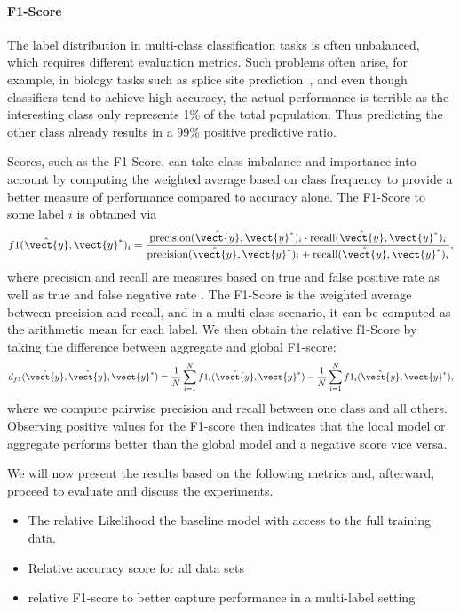 \paragraph*{F1-Score}
The label distribution in multi-class classification tasks is often unbalanced, which requires different evaluation metrics.
Such problems often arise, for example, in biology tasks such as splice site prediction~\cite{sonnenburg2007accurate}, and even though classifiers tend to achieve high accuracy, the actual performance is terrible as the interesting class only represents 1\% of the total population.
Thus predicting the other class already results in a 99\% positive predictive ratio.

Scores, such as the F1-Score, can take class imbalance and importance into account by computing the weighted average based on class frequency to provide a better measure of performance compared to accuracy alone.
The F1-Score \wrt to some label $i$ is obtained via 
\begin{equation}
    f1(\hat{\vect{y}},\vect{y}^*)_i = \frac{\text{precision}(\hat{\vect{y}},\vect{y}^*)_i \cdot \text{recall}(\hat{\vect{y}},\vect{y}^*)_i}{\text{precision}(\hat{\vect{y}},\vect{y}^*)_i + \text{recall}(\hat{\vect{y}},\vect{y}^*)_i},
\end{equation}
where precision and recall are measures based on true and false positive rate as well as true and false negative rate\cite{friedman2001elements} \cite{hossin2015review}.
The F1-Score is the weighted average between precision and recall, and in a multi-class scenario, it can be computed as the arithmetic mean for each label.
We then obtain the relative f1-Score by taking the difference between aggregate and global F1-score:
\begin{equation}
    d_{f1}(\tilde{\vect{y}}, \hat{\vect{y}},\vect{y}^*) = \frac{1}{N} \sum_{i=1}^N f1_i(\tilde{\vect{y}},\vect{y}^*) - \frac{1}{N} \sum_{i=1}^N f1_i(\hat{\vect{y}},\vect{y}^*),
\end{equation}
where we compute pairwise precision and recall between one class and all others.
Observing positive values for the F1-score then indicates that the local model or aggregate performs better than the global model and a negative score vice versa.

We will now present the results based on the following metrics and, afterward, proceed to evaluate and discuss the experiments.
\begin{itemize}
    \item The relative Likelihood \wrt the baseline model with access to the full training data.
    \item Relative accuracy score for all data sets
    \item relative F1-score to better capture performance in a multi-label setting 
\end{itemize}


